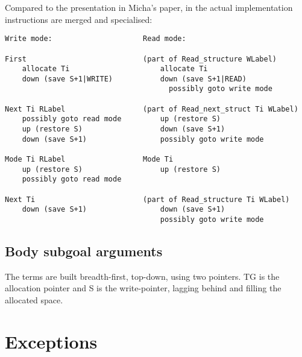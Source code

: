    Compared to the presentation in Micha's paper, in the actual
   implementation instructions are merged and specialised:
\begin{verbatim}
Write mode:                     Read mode:

First                           (part of Read_structure WLabel)
    allocate Ti                     allocate Ti
    down (save S+1|WRITE)           down (save S+1|READ)
                                      possibly goto write mode

Next Ti RLabel                  (part of Read_next_struct Ti WLabel)
    possibly goto read mode         up (restore S)
    up (restore S)                  down (save S+1)
    down (save S+1)                 possibly goto write mode
                      
Mode Ti RLabel                  Mode Ti
    up (restore S)                  up (restore S)
    possibly goto read mode

Next Ti                         (part of Read_structure Ti WLabel)
    down (save S+1)                 down (save S+1)
                                    possibly goto write mode
\end{verbatim}


\subsection{Body subgoal arguments}

    The terms are built breadth-first, top-down, using two pointers.
    TG is the allocation pointer and S is the write-pointer, lagging
    behind and filling the allocated space.



\section{Exceptions}

